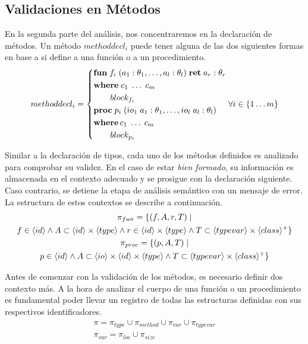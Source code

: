 \documentclass{article}
\begin{document}
\subsection{Validaciones en Métodos}

En la segunda parte del análisis, nos concentraremos en la declaración de métodos.
Un método $methoddecl_i$ puede tener alguna de las dos siguientes formas en base a si define a una función o a un procedimiento.
\begin{gather*}
methoddecl_i =
\begin{cases*}
\T{fun} \; f_i \; (a_1: \theta_1, \ldots, a_l: \theta_l) \; \T{ret} \; a_r: \theta_r
\\
\T{where} \; c_1 \; \ldots \; c_m
\\
\qquad block_{f_i}
\\
\T{proc} \; p_i \; (io_1 \; a_1: \theta_1, \ldots, io_l \; a_l: \theta_l)
\\
\T{where} \, c_1 \; \ldots \; c_m
\\
\qquad block_{p_i}
\end{cases*}
\forall i \in \{ 1 \ldots m \}
\end{gather*}

Similar a la declaración de tipos, cada uno de los métodos definidos es analizado para comprobar su validez.
En el caso de estar \textit{bien formado}, su información es almacenada en el contexto adecuado y se prosigue con la declaración siguiente.
Caso contrario, se detiene la etapa de análisis semántico con un mensaje de error.
La estructura de estos contextos se describe a continuación.
\begin{gather*}
\pi_{fun} =
\{
(f, A, r, T) \mid
\\
f \in \langle id \rangle
\wedge
A \subset \langle id \rangle \times \langle type \rangle
\wedge
r \in \langle id \rangle \times \langle type \rangle
\wedge
T \subset \langle typevar \rangle \times \langle class \rangle^+
\}
\\
\pi_{proc} =
\{
(p, A, T) \mid
\\
p \in \langle id \rangle
\wedge
A \subset \langle io \rangle \times \langle id \rangle \times \langle type \rangle
\wedge
T \subset \langle typevar \rangle \times \langle class \rangle^+
\}
\end{gather*}

Antes de comenzar con la validación de los métodos, es necesario definir dos contexto más.
A la hora de analizar el cuerpo de una función o un procedimiento es fundamental poder llevar un registro de todas las estructuras definidas con sus respectivos identificadores.
\begin{gather*}
\pi = \pi_{type} \cup \pi_{method} \cup \pi_{var} \cup \pi_{typevar}
\\
\pi_{var} = \pi_{loc} \cup \pi_{size}
\end{gather*}
\end{document}
